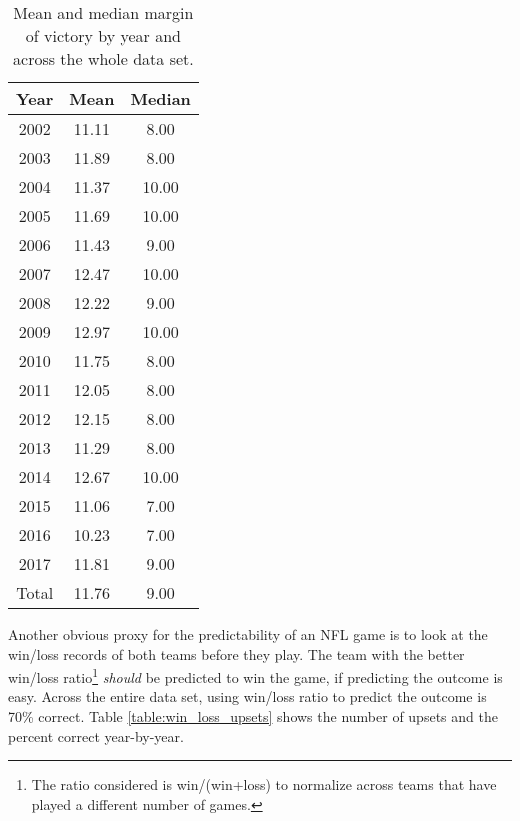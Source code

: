 \documentclass[11pt]{article}
\begin{document}
\begin{table}[!htb]
\begin{center}
\scriptsize
\begin{tabular}{|c|c|c|}
\hline
Year & Mean & Median\\
\hline
2002 & 11.11 & 8.00\\
2003 & 11.89 & 8.00\\
2004 & 11.37 & 10.00\\
2005 & 11.69 & 10.00\\
2006 & 11.43 & 9.00\\
2007 & 12.47 & 10.00\\
2008 & 12.22 & 9.00\\
2009 & 12.97 & 10.00\\
2010 & 11.75 & 8.00\\
2011 & 12.05 & 8.00\\
2012 & 12.15 & 8.00\\
2013 & 11.29 & 8.00\\
2014 & 12.67 & 10.00\\
2015 & 11.06 & 7.00\\
2016 & 10.23 & 7.00\\
2017 & 11.81 & 9.00\\
\hline
Total & 11.76 & 9.00\\
\hline
\end{tabular}
\caption{Mean and median margin of victory by year and across the whole data set.}\label{table:margin_of_victory_stat}
\end{center}
\end{table}

Another obvious proxy for the predictability of an NFL game is to look at the win/loss records of both teams before they play. The team with the better win/loss ratio\footnote{The ratio considered is win/(win+loss) to normalize across teams that have played a different number of games.} \emph{should} be predicted to win the game, if predicting the outcome is easy. Across the entire data set, using win/loss ratio to predict the outcome is 70\% correct. Table \ref{table:win_loss_upsets} shows the number of upsets and the percent correct year-by-year.
\end{document}
